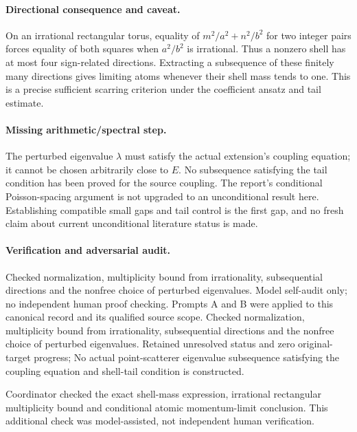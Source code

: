 \documentclass[11pt]{article}
\begin{document}
\paragraph{Directional consequence and caveat.} On an irrational rectangular torus, equality of $m^2/a^2+n^2/b^2$ for two integer pairs forces equality of both squares when $a^2/b^2$ is irrational. Thus a nonzero shell has at most four sign-related directions. Extracting a subsequence of these finitely many directions gives limiting atoms whenever their shell mass tends to one. This is a precise sufficient scarring criterion under the coefficient ansatz and tail estimate.

\paragraph{Missing arithmetic/spectral step.} The perturbed eigenvalue $\lambda$ must satisfy the actual extension's coupling equation; it cannot be chosen arbitrarily close to $E$. No subsequence satisfying the tail condition has been proved for the source coupling. The report's conditional Poisson-spacing argument is not upgraded to an unconditional result here. Establishing compatible small gaps and tail control is the first gap, and no fresh claim about current unconditional literature status is made.

\paragraph{Verification and adversarial audit.}
Checked normalization, multiplicity bound from irrationality, subsequential directions and the nonfree choice of perturbed eigenvalues. Model self-audit only; no independent human proof checking. Prompts A and B were applied to this canonical record and its qualified source scope. Checked normalization, multiplicity bound from irrationality, subsequential directions and the nonfree choice of perturbed eigenvalues. Retained unresolved status and zero original-target progress; No actual point-scatterer eigenvalue subsequence satisfying the coupling equation and shell-tail condition is constructed.

Coordinator checked the exact shell-mass expression, irrational rectangular multiplicity bound and conditional atomic momentum-limit conclusion. This additional check was model-assisted, not independent human verification.
\end{document}
